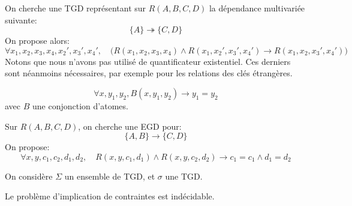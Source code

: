 \documentclass[french, toc]{../cs-classes/cs-classes}
\begin{document}
\begin{exemple}
    On cherche une TGD représentant sur $R(A, B, C, D)$ la dépendance multivariée suivante:
    \begin{equation*}
        \{A\} \twoheadrightarrow \{C, D\}
    \end{equation*}
    On propose alors:
    \begin{equation*}
        \forall x_1, x_2, x_3, x_4, x_2', x_3', x_4', \quad \big(R(x_1, x_2, x_3, x_4) \land R(x_1, x_2', x_3', x_4') \rightarrow R(x_1, x_2, x_3', x_4')\big)
    \end{equation*}
    Notons que nous n'avons pas utilisé de quantificateur existentiel. Ces derniers sont néanmoins nécessaires, par exemple pour les relations des clés étrangères.
\end{exemple}

\begin{definition}
    \begin{equation*}
        \forall x, y_1, y_2, B(x, y_1, y_2) \rightarrow y_1 = y_2
    \end{equation*}
    avec $B$ une conjonction d'atomes.
\end{definition}

\begin{exemple}
    Sur $R(A, B, C, D)$, on cherche une EGD pour:
    \begin{equation*}
        \{A, B\} \rightarrow \{C, D\}
    \end{equation*}
    On propose:
    \begin{equation*}
        \forall x, y, c_1, c_2, d_1, d_2, \quad R(x, y, c_1, d_1) \land R(x, y, c_2, d_2) \rightarrow c_1=c_1 \land d_1=d_2
    \end{equation*}
\end{exemple}

\begin{definition}[Chase]
    On considère $\Sigma$ un ensemble de TGD, et $\sigma$ une TGD.
\end{definition}

\begin{theoreme}
    Le problème d'implication de contraintes est indécidable.
\end{theoreme}
\end{document}
